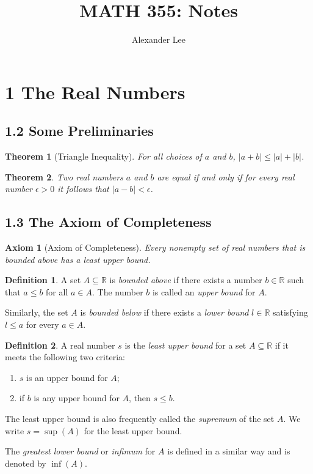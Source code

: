 \documentclass[11pt]{amsart}
\title{MATH 355: Notes}
\author{Alexander Lee}
\newtheorem*{theorem}{Theorem}
\newtheorem*{axiom}{Axiom}
\theoremstyle{definition}
\newtheorem*{definition}{Definition}
\newcommand{\R}{\mathbb{R}}
\newcommand{\abs}[1]{|#1|}
\begin{document}
\maketitle

\section*{1 The Real Numbers}

\subsection*{1.2 Some Preliminaries}

\begin{theorem}[Triangle Inequality]
  For all choices of $a$ and $b$, $\abs{a + b} \le \abs{a} + \abs{b}$.
\end{theorem}

\begin{theorem}
  Two real numbers $a$ and $b$ are equal if and only if for every real number
  $\epsilon > 0$ it follows that $\abs{a-b} < \epsilon$.
\end{theorem}

\subsection*{1.3 The Axiom of Completeness}

\begin{axiom}[Axiom of Completeness]
  Every nonempty set of real numbers that is bounded above has a least upper
  bound.
\end{axiom}

\begin{definition}
  A set $A \subseteq \R$ is \emph{bounded above} if there exists a number $b \in
  \R$ such that $a \le b$ for all $a \in A$. The number $b$ is called an
  \emph{upper bound} for $A$.

  Similarly, the set $A$ is \emph{bounded below} if there exists a \emph{lower
  bound} $l \in \R$ satisfying $l \le a$ for every $a \in A$.
\end{definition}

\begin{definition}
  A real number $s$ is the \emph{least upper bound} for a set $A \subseteq \R$
  if it meets the following two criteria:
  \begin{enumerate}[label={(\roman*)}]
    \item $s$ is an upper bound for $A$;
    \item if $b$ is any upper bound for $A$, then $s \le b$.
  \end{enumerate}
  The least upper bound is also frequently called the \emph{supremum} of the set
  $A$. We write $s = \sup(A)$ for the least upper bound.

  The \emph{greatest lower bound} or \emph{infimum} for $A$ is defined in a
  similar way and is denoted by $\inf(A)$.
\end{definition}
\end{document}
